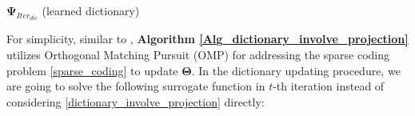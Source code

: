 \documentclass[final,5p,times,twocolumn]{elsarticle}
\begin{document}
\begin{algorithm}[htb]
\begin{algorithmic}[1]
		\ENDFOR
		\RETURN $\bm\Psi_{Iter_{dic}}$ (learned dictionary)
	\end{algorithmic}
\end{algorithm}

For simplicity, similar to \cite{DCS09,BLLLJC15}, {\bf Algorithm \ref{Alg_dictionary_involve_projection}}  utilizes Orthogonal Matching Pursuit (OMP) for addressing the sparse coding problem \eqref{sparse_coding} to update $\bm \Theta$. In the dictionary updating procedure, we are going to solve the following surrogate function in $t$-th iteration instead of considering \eqref{dictionary_involve_projection} directly:
\end{document}
